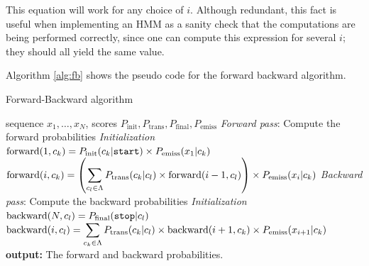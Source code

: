 This equation will work for any choice of $i$. Although redundant, this fact is useful when implementing an
HMM as a sanity check that the computations are being performed
correctly, since one can compute this expression for several $i$; they should all yield the same value. 

Algorithm \ref{alg:fb} shows the pseudo code for the forward backward algorithm.



\begin{algorithm}[t]
   \caption{Forward-Backward algorithm \label{alg:fb}}
\begin{algorithmic}[1]
    sequence $x_1,\ldots,x_N$, scores $P_{\mathrm{init}}, P_{\mathrm{trans}}, P_{\mathrm{final}}, P_{\mathrm{emiss}}$
        \STATE  \emph{Forward pass}: Compute the forward probabilities
        \STATE \emph{Initialization}
        \STATE $\mathrm{forward}(1,c_k) = P_{\mathrm{init}}(c_k|\text{\tt start}) \times 
P_{\mathrm{emiss}}(x_1 | c_k)$
        \ENDFOR 
                 \STATE $\mathrm{forward}(i, c_k) = \left( \displaystyle \sum_{c_l \in \Lambda} P_{\mathrm{trans}}(c_k | c_l) \times \mathrm{forward}(i-1, c_l) \right) \times P_{\mathrm{emiss}}(x_i | c_k)$
         \ENDFOR 
        \ENDFOR 
       \STATE \emph{Backward pass}: Compute the backward probabilities
       \STATE \emph{Initialization}
        \STATE $\mathrm{backward}(N, c_l) = P_{\mathrm{final}}(\text{\tt stop} | c_l)$
        \ENDFOR 
        \STATE $\mathrm{backward}(i, c_l) =  \displaystyle \sum_{c_k \in \Lambda} P_{\mathrm{trans}}(c_k | c_l) \times \mathrm{backward}(i+1, c_k) \times P_{\mathrm{emiss}}(x_{i+1} | c_k)$
        \ENDFOR 
       \STATE \textbf{output:} The forward and backward probabilities.
\end{algorithmic}
\end{algorithm}





